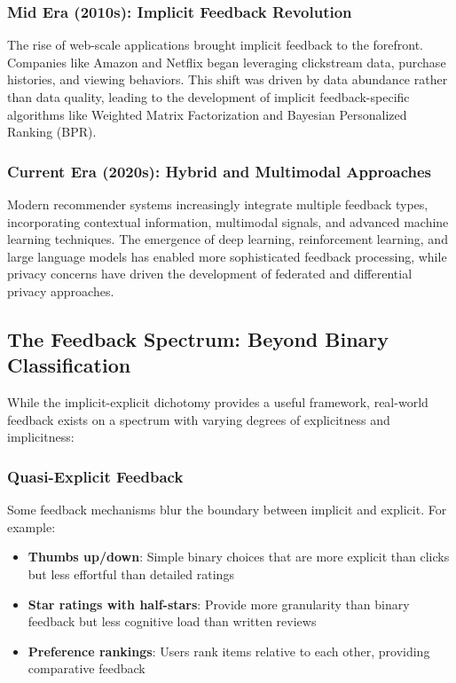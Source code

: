 \documentclass[acmsmall,review,anonymous]{acmart}
\begin{document}
\subsubsection{Mid Era (2010s): Implicit Feedback Revolution}
The rise of web-scale applications brought implicit feedback to the forefront. Companies like Amazon and Netflix began leveraging clickstream data, purchase histories, and viewing behaviors. This shift was driven by data abundance rather than data quality, leading to the development of implicit feedback-specific algorithms like Weighted Matrix Factorization and Bayesian Personalized Ranking (BPR).

\subsubsection{Current Era (2020s): Hybrid and Multimodal Approaches}
Modern recommender systems increasingly integrate multiple feedback types, incorporating contextual information, multimodal signals, and advanced machine learning techniques. The emergence of deep learning, reinforcement learning, and large language models has enabled more sophisticated feedback processing, while privacy concerns have driven the development of federated and differential privacy approaches.

\subsection{The Feedback Spectrum: Beyond Binary Classification}

While the implicit-explicit dichotomy provides a useful framework, real-world feedback exists on a spectrum with varying degrees of explicitness and implicitness:

\subsubsection{Quasi-Explicit Feedback}
Some feedback mechanisms blur the boundary between implicit and explicit. For example:
\begin{itemize}
    \item \textbf{Thumbs up/down}: Simple binary choices that are more explicit than clicks but less effortful than detailed ratings
    \item \textbf{Star ratings with half-stars}: Provide more granularity than binary feedback but less cognitive load than written reviews
    \item \textbf{Preference rankings}: Users rank items relative to each other, providing comparative feedback
\end{itemize}
\end{document}
